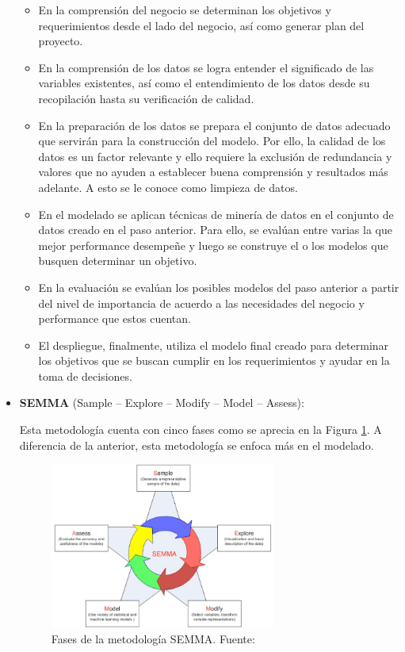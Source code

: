 \begin{itemize}
	\begin{itemize}
		\item En la comprensión del negocio se determinan los objetivos y requerimientos desde el lado del negocio, así como generar plan del proyecto.
		\item En la comprensión de los datos se logra entender el significado de las variables existentes, así como el entendimiento de los datos desde su recopilación hasta su verificación de calidad.
		\item En la preparación de los datos se prepara el conjunto de datos adecuado que servirán para la construcción del modelo. Por ello, la calidad de los datos es un factor relevante y ello requiere la exclusión de redundancia y valores que no ayuden a establecer buena comprensión y resultados más adelante. A esto se le conoce como limpieza de datos.
		\item En el modelado se aplican técnicas de minería de datos en el conjunto de datos creado en el paso anterior. Para ello, se evalúan entre varias la que mejor performance desempeñe y luego se construye el o los modelos que busquen determinar un objetivo.
		\item En la evaluación se evalúan los posibles modelos del paso anterior a partir del nivel de importancia de acuerdo a las necesidades del negocio y performance que estos cuentan.
		\item El despliegue, finalmente, utiliza el modelo final creado para determinar los objetivos que se buscan cumplir en los requerimientos y ayudar en la toma de decisiones.
	\end{itemize}
	
	\item \textbf{SEMMA} (Sample – Explore – Modify – Model – Assess):
	
	Esta metodología cuenta con cinco fases como se aprecia en la Figura \ref{2:fig8}. A diferencia de la anterior, esta metodología se enfoca más en el modelado.
	\begin{figure}[h]
		\begin{center}
			\includegraphics[width=0.70\textwidth]{2/figures/semma.jpg}
			\caption{Fases de la metodología SEMMA. Fuente: \cite{tec_braulio2015metodologiasdm}}
			\label{2:fig8}
		\end{center}
	\end{figure}
	

\end{itemize}
